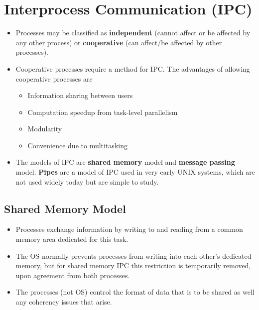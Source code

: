 \documentclass{article}
\theoremstyle{plain}
\theoremstyle{definition}
\begin{document}
\section{Interprocess Communication (IPC)}
\begin{itemize}
    \item Processes may be classified as \textbf{independent} (cannot affect or be affected by any other process) or \textbf{cooperative} (can affect/be affected by other processes).
    
    \item Cooperative processes require a method for IPC. The advantages of allowing cooperative processes are 
    \begin{itemize}
        \item Information sharing between users
        
        \item Computation speedup from task-level parallelism 
        
        \item Modularity
        
        \item Convenience due to multitasking
    \end{itemize}
    
    \item The models of IPC are \textbf{shared memory} model and \textbf{message passing} model. \textbf{Pipes} are a model of IPC used in very early UNIX systems, which are not used widely today but are simple to study. 
\end{itemize}

\subsection{Shared Memory Model}
\begin{itemize}
    \item Processes exchange information by writing to and reading from a common memory area dedicated for this task. 
    
    \item The OS normally prevents processes from writing into each other's dedicated memory, but for shared memory IPC this restriction is temporarily removed, upon agreement from both processes. 
    
    
    \item The processes (not OS) control the format of data that is to be shared  as well any coherency issues that arise.
    
\end{itemize}
\end{document}
